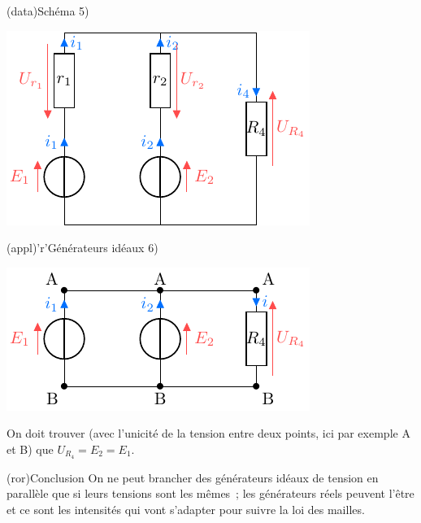 \documentclass[../../main/main.tex]{subfiles}
\begin{document}
{\begin{tcbraster}[raster columns=5, raster equal height=rows]
    \begin{tcb}[raster multicolumn=2](data){Schéma}
        5)
        \vspace*{-12pt}
        \begin{center}
            \includegraphics{assogen_parr}
        \end{center}
    \end{tcb}
    \begin{tcb}[raster multicolumn=3](appl)'r'{Générateurs idéaux}
        6)\vspace*{-20pt}
        \begin{center}
            \includegraphics{assogen_parr-ideal}
        \end{center}
        On doit trouver (avec l'unicité de la tension entre deux points, ici par
        exemple A et B) que $U_{R_4} = E_2 = E_1$.
    \end{tcb}
\end{tcbraster}
\begin{center}
    \begin{tcb}[width=\linewidth](ror){Conclusion}
        On ne peut brancher des générateurs idéaux de tension en parallèle que
        si leurs tensions sont les mêmes~; les générateurs réels peuvent l'être
        et ce sont les intensités qui vont s'adapter pour suivre la loi des
        mailles.
    \end{tcb}
\end{center}
}
\end{document}
